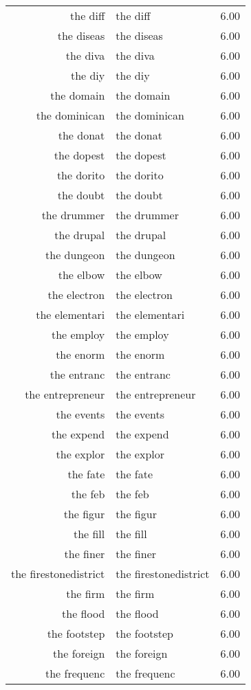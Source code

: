 \begin{table}[ht]
\begin{tabular}{rlr}
  the diff & the diff & 6.00 \\ 
  the diseas & the diseas & 6.00 \\ 
  the diva & the diva & 6.00 \\ 
  the diy & the diy & 6.00 \\ 
  the domain & the domain & 6.00 \\ 
  the dominican & the dominican & 6.00 \\ 
  the donat & the donat & 6.00 \\ 
  the dopest & the dopest & 6.00 \\ 
  the dorito & the dorito & 6.00 \\ 
  the doubt & the doubt & 6.00 \\ 
  the drummer & the drummer & 6.00 \\ 
  the drupal & the drupal & 6.00 \\ 
  the dungeon & the dungeon & 6.00 \\ 
  the elbow & the elbow & 6.00 \\ 
  the electron & the electron & 6.00 \\ 
  the elementari & the elementari & 6.00 \\ 
  the employ & the employ & 6.00 \\ 
  the enorm & the enorm & 6.00 \\ 
  the entranc & the entranc & 6.00 \\ 
  the entrepreneur & the entrepreneur & 6.00 \\ 
  the events & the events & 6.00 \\ 
  the expend & the expend & 6.00 \\ 
  the explor & the explor & 6.00 \\ 
  the fate & the fate & 6.00 \\ 
  the feb & the feb & 6.00 \\ 
  the figur & the figur & 6.00 \\ 
  the fill & the fill & 6.00 \\ 
  the finer & the finer & 6.00 \\ 
  the firestonedistrict & the firestonedistrict & 6.00 \\ 
  the firm & the firm & 6.00 \\ 
  the flood & the flood & 6.00 \\ 
  the footstep & the footstep & 6.00 \\ 
  the foreign & the foreign & 6.00 \\ 
  the frequenc & the frequenc & 6.00 \\ 

\end{tabular}
\end{table}
